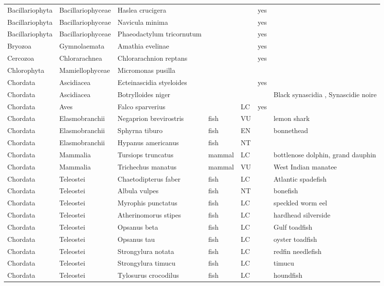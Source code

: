 \begin{longtable}{lllllll}
  Bacillariophyta & Bacillariophyceae & Haslea crucigera &  &  & yes &  \\ 
  Bacillariophyta & Bacillariophyceae & Navicula minima &  &  & yes &  \\ 
  Bacillariophyta & Bacillariophyceae & Phaeodactylum tricornutum &  &  & yes &  \\ 
  Bryozoa & Gymnolaemata & Amathia evelinae &  &  & yes &  \\ 
  Cercozoa & Chlorarachnea & Chlorarachnion reptans &  &  & yes &  \\ 
  Chlorophyta & Mamiellophyceae & Micromonas pusilla &  &  &  &  \\ 
  Chordata & Ascidiacea & Ecteinascidia styeloides &  &  & yes &  \\ 
  Chordata & Ascidiacea & Botrylloides niger &  &  &  & Black synascidia , Synascidie noire \\ 
  Chordata & Aves & Falco sparverius &  & LC & yes &  \\ 
  Chordata & Elasmobranchii & Negaprion brevirostris & fish & VU &  & lemon shark \\ 
  Chordata & Elasmobranchii & Sphyrna tiburo & fish & EN &  & bonnethead \\ 
  Chordata & Elasmobranchii & Hypanus americanus & fish & NT &  &  \\ 
  Chordata & Mammalia & Tursiops truncatus & mammal & LC &  & bottlenose dolphin, grand dauphin \\ 
  Chordata & Mammalia & Trichechus manatus & mammal & VU &  & West Indian manatee \\ 
  Chordata & Teleostei & Chaetodipterus faber & fish & LC &  & Atlantic spadefish \\ 
  Chordata & Teleostei & Albula vulpes & fish & NT &  & bonefish \\ 
  Chordata & Teleostei & Myrophis punctatus & fish & LC &  & speckled worm eel \\ 
  Chordata & Teleostei & Atherinomorus stipes & fish & LC &  & hardhead silverside \\ 
  Chordata & Teleostei & Opsanus beta & fish & LC &  & Gulf toadfish \\ 
  Chordata & Teleostei & Opsanus tau & fish & LC &  & oyster toadfish \\ 
  Chordata & Teleostei & Strongylura notata & fish & LC &  & redfin needlefish \\ 
  Chordata & Teleostei & Strongylura timucu & fish & LC &  & timucu \\ 
  Chordata & Teleostei & Tylosurus crocodilus & fish & LC &  & houndfish \\ 

\end{longtable}
